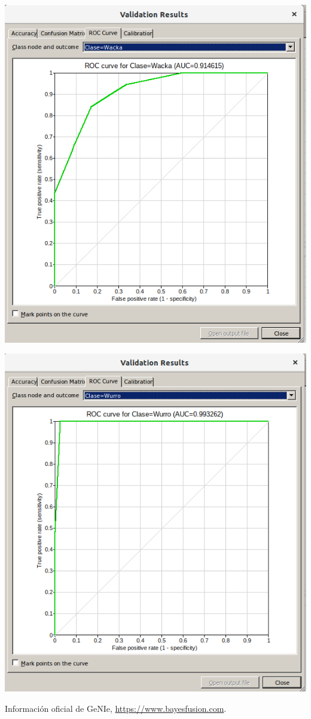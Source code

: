 \documentclass{article}
\begin{document}
\begin{center}
\includegraphics[scale=0.4]{images/4w3.png}
\end{center}

\begin{center}
\includegraphics[scale=0.4]{images/4w4.png}
\end{center}

\begin{thebibliography}{9}
 Información oficial de GeNIe, \url{https://www.bayesfusion.com}.
\end{thebibliography}
\end{document}

